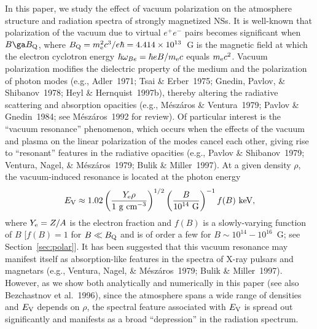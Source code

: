 \documentclass{mn2e}
\newcommand{\be}{\begin{equation}}
\newcommand{\ee}{\end{equation}}
\newcommand{\lp}{\left(}
\newcommand{\rp}{\right)}
\newcommand{\etal}{et al.}
\newcommand{\me}{m_{\rm e}}
\newcommand{\Ye}{Y_{\rm e}}
\newcommand{\omegab}{\omega_{Be}}
\newcommand{\Bq}{B_{\rm Q}}
\newcommand{\Evp}{E_{\rm V}}
\begin{document}
In this paper, we study the effect of vacuum polarization on
the atmosphere structure and radiation spectra of strongly
magnetized NSs.  It is well-known that polarization
of the vacuum due to virtual $e^+e^-$ pairs becomes significant
when $B\ga\Bq$, where $\Bq=\me^2c^3/e\hbar=4.414\times 10^{13}$~G
is the magnetic field at which the electron cyclotron energy
$\hbar\omegab=\hbar eB/\me c$ equals $\me c^2$.  Vacuum
polarization modifies the dielectric property of the medium
and the polarization of photon modes
(e.g., Adler~1971; Tsai \& Erber~1975; Gnedin, Pavlov, \& Shibanov~1978;
Heyl \& Hernquist~1997b), thereby altering the
radiative scattering and absorption opacities 
(e.g., M\'{e}sz\'{a}ros \& Ventura~1979; Pavlov \& Gnedin~1984;
see M\'{e}sz\'{a}ros~1992 for review).
Of particular interest is the ``vacuum resonance'' phenomenon, which
occurs when the effects of the vacuum and plasma on the linear
polarization of the modes cancel each other, giving rise to
``resonant'' features in the radiative opacities
(e.g., Pavlov \& Shibanov~1979; Ventura, Nagel, \& M\'{e}sz\'{a}ros~1979;
Bulik \& Miller~1997).
At a given density $\rho$, the vacuum-induced
resonance is located at the photon energy
\be
\Evp \approx 1.02\lp\frac{\Ye\rho}{\mbox{1 g cm$^{-3}$}}\rp^{1/2}
 \lp\frac{B}{\mbox{10$^{14}$ G}}\rp^{-1}f(B)\mbox{ keV},
\ee
where $\Ye=Z/A$ is the electron fraction and $f(B)$ is a
slowly-varying function of $B$ [$f(B)=1$ for $B\ll\Bq$ and is of
order a few for $B\sim 10^{14}-10^{16}$~G; see Section~\ref{sec:polar}].
It has been suggested that
this vacuum resonance may manifest itself as absorption-like
features in the spectra of X-ray pulsars and magnetars
(e.g., Ventura, Nagel, \& M\'{e}sz\'{a}ros~1979; Bulik \& Miller~1997).
However, as we show both analytically and numerically in this paper
(see also Bezchastnov \etal~1996),
since the atmosphere spans a wide range of densities and $\Evp$
depends on $\rho$, the spectral feature associated
with $\Evp$ is spread out significantly and manifests as a broad
``depression'' in the radiation spectrum.
\end{document}
